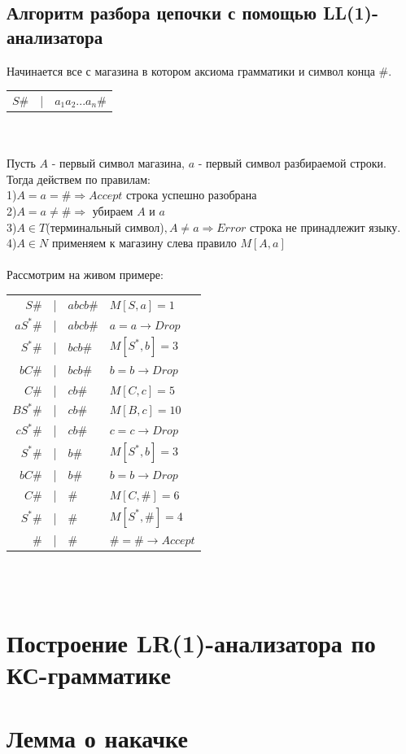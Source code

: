\documentclass[14pt]{extreport}
\begin{document}
	\section{Алгоритм разбора цепочки с помощью LL(1)-анализатора}
	Начинается все с магазина в котором аксиома грамматики и символ конца $\#$.\\
	\begin{tabular}{rcl}
		$S\#$ & | & $a_1a_2...a_n\#$
	\end{tabular}\\\\
	Пусть $A$ - первый символ магазина, $a$ - первый символ разбираемой строки.\\
	Тогда действем по правилам:\\
	\hspace*{30pt}1)$A=a=\# \Rightarrow Accept$ строка успешно разобрана\\
	\hspace*{30pt}2)$A=a \neq \# \Rightarrow$ убираем $A$ и $a$\\
	\hspace*{30pt}3)$A \in T$(терминальный символ)$,A \neq a \Rightarrow Error$ строка не
	принадлежит языку.\\
	\hspace*{30pt}4)$A \in N$ применяем к магазину слева правило $M[A, a]$\\\\
	Рассмотрим на живом примере:\\
	\begin{tabular}{rcll}
		$S\#$ & | & $abcb\#$ & $M[S,a]=1$\\
		$aS^*\#$ & | & $abcb\#$ & $a=a \to Drop$\\
		$S^*\#$ & | & $bcb\#$ & $M[S^*,b]=3$\\
		$bC\#$ & | & $bcb\#$ & $b=b \to Drop$\\
		$C\#$ & | & $cb\#$ & $M[C, c]=5$\\
		$BS^*\#$ & | & $cb\#$ & $M[B, c]=10$\\
		$cS^*\#$ & | & $cb\#$ & $c=c \to Drop$\\
		$S^*\#$ & | & $b\#$ & $M[S^*,b]=3$\\
		$bC\#$ & | & $b\#$ & $b=b \to Drop$\\
		$C\#$ & | & $\#$ & $M[C, \#]=6$\\
		$S^*\#$ & | & $\#$ & $M[S^*, \#]=4$\\
		$\#$ & | & $\#$ & $\#=\# \to Accept$\\
	\end{tabular}\\\\
	
	
	\chapter{Построение LR(1)-анализатора по КС-грамматике}
	\chapter{Лемма о накачке}
	
	
	
	
\end{document}
